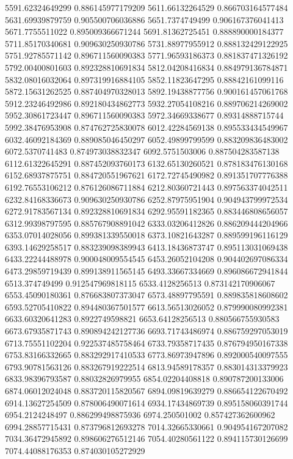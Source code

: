 {5591.62324649299 0.886145977179209
5611.66132264529 0.866703164577484
5631.69939879759 0.905500706036886
5651.7374749499 0.906167376041413
5671.7755511022 0.895009366671244
5691.81362725451 0.888890000184377
5711.85170340681 0.909630250930786
5731.88977955912 0.888132429122925
5751.92785571142 0.896711560090383
5771.96593186373 0.881837471326192
5792.00400801603 0.892328810691834
5812.04208416834 0.884979136784871
5832.08016032064 0.897319916884105
5852.11823647295 0.88842161099116
5872.15631262525 0.887404970328013
5892.19438877756 0.900161457061768
5912.23246492986 0.892180434862773
5932.27054108216 0.889706214269002
5952.30861723447 0.896711560090383
5972.34669338677 0.89314888715744
5992.38476953908 0.874762725830078
6012.42284569138 0.895533434549967
6032.46092184369 0.889085046450297
6052.49899799599 0.883209836483002
6072.5370741483 0.874973038832347
6092.5751503006 0.887504283587138
6112.61322645291 0.887452093760173
6132.65130260521 0.878183476130168
6152.68937875751 0.884720551967621
6172.72745490982 0.891351707776388
6192.76553106212 0.876126086711884
6212.80360721443 0.897563374042511
6232.84168336673 0.909630250930786
6252.87975951904 0.904943799972534
6272.91783567134 0.892328810691834
6292.95591182365 0.883446808656057
6312.99398797595 0.885767908891042
6333.03206412826 0.886209444204966
6353.07014028056 0.899381339550018
6373.10821643287 0.889599196116129
6393.14629258517 0.883239098389943
6413.18436873747 0.895113031069438
6433.22244488978 0.900048009554545
6453.26052104208 0.904402697086334
6473.29859719439 0.899138911565145
6493.33667334669 0.896086672941844
6513.374749499 0.912547969818115
6533.4128256513 0.873142170906067
6553.45090180361 0.876683807373047
6573.48897795591 0.889835818608602
6593.52705410822 0.894480367501577
6613.56513026052 0.879990080992381
6633.60320641283 0.8922749598821
6653.64128256513 0.880566755930583
6673.67935871743 0.890894242127736
6693.71743486974 0.886759297053019
6713.75551102204 0.922537485758464
6733.79358717435 0.876794950167338
6753.83166332665 0.883292917410533
6773.86973947896 0.892000540097555
6793.90781563126 0.883267919222514
6813.94589178357 0.883014313379923
6833.98396793587 0.88032826979955
6854.02204408818 0.890787200133006
6874.06012024048 0.883720115820567
6894.09819639279 0.886654122670492
6914.13627254509 0.878006490071614
6934.17434869739 0.895158060391744
6954.2124248497 0.886299498875936
6974.250501002 0.857427362600962
6994.28857715431 0.873796812693278
7014.32665330661 0.904954167207082
7034.36472945892 0.898606276512146
7054.40280561122 0.894115730126699
7074.44088176353 0.874030105272929
}
